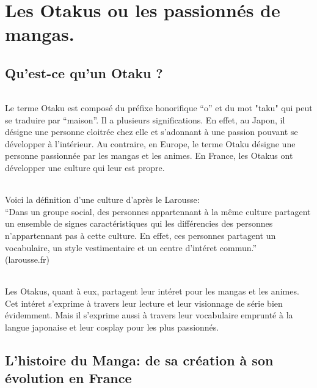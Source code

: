 \part{Les Otakus ou les passionnés de mangas.}

\chapter{Qu'est-ce qu'un Otaku ?}

\paragraph{} Le terme Otaku est composé du préfixe honorifique ``o'' et du mot
"taku" qui peut se traduire par ``maison''. Il a plusieurs significations. En
effet, au Japon, il désigne une personne cloitrée chez elle et s'adonnant à une
passion pouvant se développer à l'intérieur. Au contraire, en Europe, le terme
Otaku désigne une personne passionnée par les mangas et les animes. En France,
les Otakus ont développer une culture qui leur est propre.

\paragraph{} Voici la définition d'une culture d'après le Larousse:\\
``Dans un groupe social, des personnes appartennant à la même
culture partagent un ensemble de signes caractéristiques qui les différencies
des personnes n'appartennant pas à cette culture. En effet, ces personnes
partagent un vocabulaire, un style vestimentaire et un centre d'intéret
commun.''\\
(larousse.fr)

\paragraph{} Les Otakus, quant à eux, partagent leur intéret pour les mangas et
les animes. Cet intéret s'exprime à travers leur lecture et leur visionnage de
série bien évidemment. Mais il s'exprime aussi à travers leur vocabulaire
emprunté à la langue japonaise et leur cosplay pour les plus passionnés. 

\chapter[L'histoire du Manga]{L'histoire du Manga: de sa création à son évolution en France}

